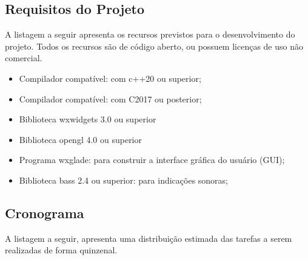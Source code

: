 \subsection{Requisitos do Projeto}

A listagem a seguir apresenta os recursos previstos para o desenvolvimento do projeto. Todos os  recursos são  de código aberto, ou possuem licenças de uso não comercial.

\begin{itemize}
\item Compilador compatível: com c++20 ou superior;
\item Compilador compatível: com C2017 ou posterior;
\item Biblioteca wxwidgets 3.0 ou superior
\item Biblioteca opengl 4.0 ou superior
\item Programa wxglade: para construir a interface gráfica do usuário (GUI);
\item Biblioteca bass 2.4 ou superior: para indicações sonoras;
\end{itemize}

\subsection{Cronograma}

A listagem a seguir, apresenta uma distribuição estimada das tarefas a serem
realizadas de forma quinzenal.

